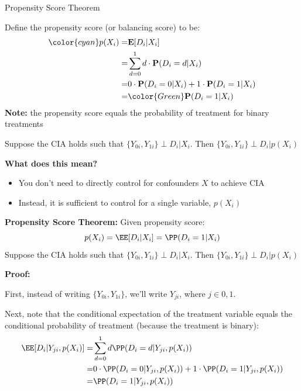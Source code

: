 \documentclass[compress, 8pt]{beamer}
\begin{document}
\begin{frame}[t]{Propensity Score Theorem}

Define the propensity score (or balancing score) to be:
\begin{align*}
{\color{cyan}p(X_i)} =& \mathbf{E} [D_i \vert X_i] \\
=& \sum_{d=0}^1 d \cdot \mathbf{P} (D_i = d \vert X_i) \\
=& 0 \cdot \mathbf{P} (D_i = 0 \vert X_i) + 1 \cdot \mathbf{P} (D_i = 1 \vert X_i) \\
=& {\color{Green}\mathbf{P} (D_i = 1 \vert X_i)}
\end{align*}
\textbf{Note:} the {\color{cyan}propensity score} equals the {\color{Green}probability of treatment} for binary treatments

\vspace{3ex}
Suppose the CIA holds such that $\{Y_{0i}, Y_{1i}\} \perp D_i \vert X_i$. Then $\{Y_{0i}, Y_{1i} \} \perp D_i \vert p(X_i)$

\vspace{3ex}\textbf{What does this mean?}
\begin{itemize}
    \item You don't need to directly control for confounders $X$ to achieve CIA
    \item Instead, it is sufficient to control for a single variable, $p(X_i)$
\end{itemize}


\end{frame}

\begin{frame}[t]{}

{\color{DarkGray}\textbf{Propensity Score Theorem:} Given propensity score:
\begin{equation*}
    p(X_i) = \EE [D_i \vert X_i] = \PP (D_i = 1 \vert X_i)
\end{equation*}
Suppose the CIA holds such that $\{Y_{0i}, Y_{1i}\} \perp D_i \vert X_i$. Then $\{Y_{0i}, Y_{1i} \} \perp D_i \vert p(X_i)$
}

\vspace{3ex}
\textbf{Proof:}

First, instead of writing $\{Y_{0i}, Y_{1i}\}$, we'll write $Y_{ji}$, where $j \in {0, 1}$.

\vspace{2ex}
Next, note that the conditional expectation of the treatment variable equals the conditional probability of treatment (because the treatment is binary):
\begin{align*}
    \EE [D_i \vert Y_{ji}, p(X_i)] =& \sum_{d = 0}^1 d \PP (D_i = d \vert Y_{ji}, p(X_i)) \\
    =& 0 \cdot \PP (D_i = 0 \vert Y_{ji}, p(X_i))
    + 1 \cdot \PP (D_i = 1 \vert Y_{ji}, p(X_i)) \\
    =& \PP (D_i = 1 \vert Y_{ji}, p(X_i))
\end{align*}
\end{frame}
\end{document}
